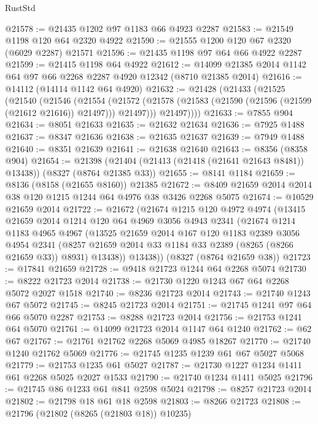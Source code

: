 \begin{lexlean}{RustStd}
\begin{coremodule}
{\begin{coremodule}
{{{{{{{{{{{{{{{{{{{{{{{{{{{{{{{{{{{{{{{{{{{{{{{{{{{{{{@21578 := @21435 @1202 @97 @1183 @66 @4923 @2287
@21583 := @21549 @1198 @120 @64 @2320 @4922
@21590 := @21555 @1200 @120 @67 @2320 (@6029 @2287) @21571
@21596 := @21435 @1198 @97 @64 @66 @4922 @2287
@21599 := @21415 @1198 @64 @4922
@21612 := @14099 @21385 @2014 @1142 @64 @97 @66 @2268 @2287 @4920 @12342 (@8710 @21385 @2014)
@21616 := @14112 (@14114 @1142 @64 @4920)
@21632 := @21428
    (@21433
      (@21525
        (@21540
          (@21546
            (@21554
              (@21572 (@21578 (@21583 (@21590 (@21596 (@21599 (@21612 @21616)) @21497))) @21497)))
            @21497))))
@21633 := @7855 @904
@21634 := @8051 @21633
@21635 := @21632 @21634
@21636 := @7925 @1488
@21637 := @8347 @21636
@21638 := @21635 @21637
@21639 := @7949 @1488
@21640 := @8351 @21639
@21641 := @21638 @21640
@21643 := @8356 (@8358 @904)
@21654 := @21398 (@21404 (@21413 (@21418 (@21641 @21643 @8481)) @13438)) (@8327 (@8764 @21385 @33))
@21655 := @8141 @1184
@21659 := @8136 (@8158 (@21655 @8160)) @21385
@21672 := @8409 @21659 @2014 @2014 @38 @120 @1215 @1244 @64 @4976 @38 @3426 @2268 @5075
@21674 := @10529 @21659 @2014
@21722 := @21672
    (@21674
      @1215
      @120
      @4972
      @4974
      (@13415
        @21659
        @2014
        @1214
        @120
        @64
        @4969
        @3056
        @4943
        @2341
        (@21674
          @1214
          @1183
          @4965
          @4967
          (@13525
            @21659
            @2014
            @167
            @120
            @1183
            @2389
            @3056
            @4954
            @2341
            (@8257 @21659 @2014 @33 @1184 @33 @2389 (@8265 (@8266 @21659 @33)) @8931)
            @13438))
        @13438))
    (@8327 (@8764 @21659 @38))
@21723 := @17841 @21659
@21728 := @9418 @21723 @1244 @64 @2268 @5074
@21730 := @8222 @21723 @2014
@21738 := @21730 @1220 @1243 @67 @64 @2268 @5072 @2027 @1518
@21740 := @8236 @21723 @2014
@21743 := @21740 @1243 @67 @5072
@21745 := @8245 @21723 @2014
@21751 := @21745 @1241 @97 @64 @66 @5070 @2287
@21753 := @8288 @21723 @2014
@21756 := @21753 @1241 @64 @5070
@21761 := @14099 @21723 @2014 @1147 @64 @1240
@21762 := @62 @67
@21767 := @21761 @21762 @2268 @5069 @4985 @18267
@21770 := @21740 @1240 @21762 @5069
@21776 := @21745 @1235 @1239 @61 @67 @5027 @5068
@21779 := @21753 @1235 @61 @5027
@21787 := @21730 @1227 @1234 @1411 @61 @2268 @5025 @2027 @1533
@21790 := @21740 @1234 @1411 @5025
@21796 := @21745 @86 @1233 @61 @841 @2598 @5024
@21798 := @8257 @21723 @2014
@21802 := @21798 @18 @61 @18 @2598
@21803 := @8266 @21723
@21808 := @21796 (@21802 (@8265 (@21803 @18)) @10235)
}}}}}}}}}}}}}}}}}}}}}}}}}}}}}}}}}}}}}}}}}}}}}}}}}}}}}}
\end{coremodule}}
\end{coremodule}
\end{lexlean}
